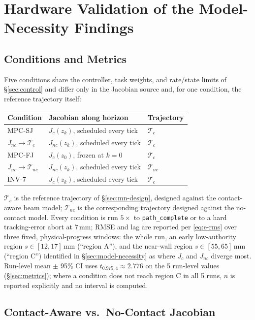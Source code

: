 \documentclass[journal]{IEEEtran}
\begin{document}
\section{Hardware Validation of the Model-Necessity Findings}
\label{sec:hw-validation}

\subsection{Conditions and Metrics}
\label{sec:hw-conditions}

Five conditions share the controller, task weights, and rate/state
limits of \S\ref{sec:control} and differ only in the Jacobian source
and, for one condition, the reference trajectory itself:
\begin{center}
\begin{tabular}{@{}lll@{}}
\toprule
Condition & Jacobian along horizon & Trajectory \\
\midrule
MPC-SJ & $J_c(z_k)$, scheduled every tick & $\mathcal{T}_c$ \\
$J_{nc}\!\to\!\mathcal{T}_c$ & $J_{nc}(z_k)$, scheduled every tick & $\mathcal{T}_c$ \\
MPC-FJ & $J_c(z_0)$, frozen at $k{=}0$ & $\mathcal{T}_c$ \\
$J_{nc}\!\to\!\mathcal{T}_{nc}$ & $J_{nc}(z_k)$, scheduled every tick & $\mathcal{T}_{nc}$ \\
INV-7 & $J_c(z_k)$, scheduled every tick & $\mathcal{T}_c$ \\
\bottomrule
\end{tabular}
\end{center}
$\mathcal{T}_c$ is the reference trajectory of \S\ref{sec:mn-design},
designed against the contact-aware beam model; $\mathcal{T}_{nc}$ is
the corresponding trajectory designed against the no-contact model.
Every condition is run $5\times$ to \texttt{path\_complete} or to a
hard tracking-error abort at $7\,\mathrm{mm}$; RMSE and lag are
reported per \eqref{eq:e-rms} over three fixed, physical-progress
windows: the whole run, an early low-authority region
$s\in[12,17]\,\mathrm{mm}$ (``region A''), and the near-wall region
$s\in[55,65]\,\mathrm{mm}$ (``region C'') identified in
\S\ref{sec:model-necessity} as where $J_c$ and $J_{nc}$ diverge most.
Run-level mean $\pm$ 95\% CI uses $t_{0.975,4}\approx2.776$ on the 5
run-level values (\S\ref{sec:metrics}); where a condition does not
reach region C in all 5 runs, $n$ is reported explicitly and no
interval is computed.

\subsection{Contact-Aware vs.\ No-Contact Jacobian}
\label{sec:hw-exp1}
\end{document}
